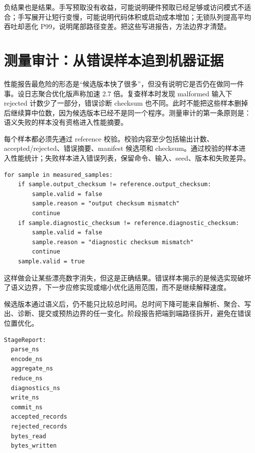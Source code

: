\begin{deepdive}
负结果也是结果。手写预取没有收益，可能说明硬件预取已经足够或访问模式不适合；手写展开让短行变慢，可能说明代码体积或启动成本增加；无锁队列提高平均吞吐却恶化 P99，说明尾部路径变差。把这些写进报告，方法边界才清楚。
\end{deepdive}

\section{测量审计：从错误样本追到机器证据}

性能报告最危险的形态是“候选版本快了很多”，但没有说明它是否仍在做同一件事。设日志聚合优化版声称加速 2.7 倍。复查样本时发现 malformed 输入下 rejected 计数少了一部分，错误诊断 checksum 也不同。此时不能把这些样本删掉后继续算中位数，因为候选版本已经不是同一个程序。测量审计的第一条原则是：语义失败的样本没有资格进入性能摘要。

每个样本都必须先通过 reference 校验。校验内容至少包括输出计数、accepted/rejected、错误摘要、manifest 候选项和 checksum。通过校验的样本进入性能统计；失败样本进入错误列表，保留命令、输入、seed、版本和失败差异。

\begin{lstlisting}[numbers=none,caption={样本进入统计前的门槛}]
for sample in measured_samples:
    if sample.output_checksum != reference.output_checksum:
        sample.valid = false
        sample.reason = "output checksum mismatch"
        continue
    if sample.diagnostic_checksum != reference.diagnostic_checksum:
        sample.valid = false
        sample.reason = "diagnostic checksum mismatch"
        continue
    sample.valid = true
\end{lstlisting}

这样做会让某些漂亮数字消失，但这是正确结果。错误样本揭示的是候选实现破坏了语义边界，下一步应修实现或缩小优化适用范围，而不是继续解释速度。

候选版本通过语义后，仍不能只比较总时间。总时间下降可能来自解析、聚合、写出、诊断、提交或预热边界的任一变化。阶段报告把端到端路径拆开，避免在错误位置优化。

\begin{lstlisting}[numbers=none,caption={阶段报告的最小字段}]
StageReport:
  parse_ns
  encode_ns
  aggregate_ns
  reduce_ns
  diagnostics_ns
  write_ns
  commit_ns
  accepted_records
  rejected_records
  bytes_read
  bytes_written
\end{lstlisting}

